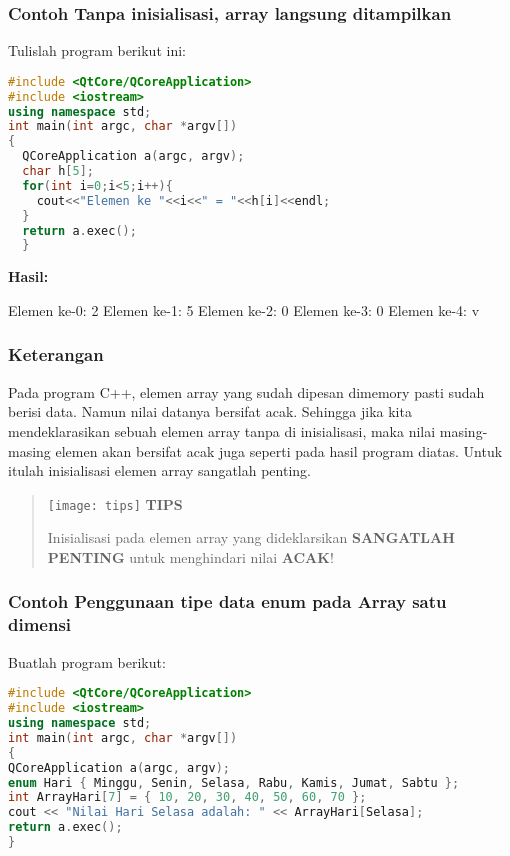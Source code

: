 \subsubsection*{Contoh  Tanpa inisialisasi, array langsung ditampilkan}

Tulislah program berikut ini:

\begin{lstlisting}[language=c++, caption=Tanpa inisialisasi array langsung ditampilkan, label=contoh3-6]
#include <QtCore/QCoreApplication>
#include <iostream>
using namespace std;
int main(int argc, char *argv[])
{
  QCoreApplication a(argc, argv);
  char h[5];
  for(int i=0;i<5;i++){
    cout<<"Elemen ke "<<i<<" = "<<h[i]<<endl;
  }
  return a.exec();
  }
\end{lstlisting}

\textbf{Hasil:}

\begin{lcverbatim}
Elemen ke-0: 2
Elemen ke-1: 5
Elemen ke-2: 0
Elemen ke-3: 0
Elemen ke-4: v
\end{lcverbatim}

\subsubsection*{Keterangan}

Pada program C++, elemen array yang sudah dipesan dimemory pasti sudah
berisi data. Namun nilai datanya bersifat acak. Sehingga jika kita
mendeklarasikan sebuah elemen array tanpa di inisialisasi, maka nilai
masing-masing elemen akan bersifat acak juga seperti pada hasil program
diatas. Untuk itulah inisialisasi elemen array sangatlah penting.

\begin{quotation}
\texttt{[image: tips]} \textbf{TIPS}
 
 Inisialisasi pada elemen array yang dideklarsikan \textbf{SANGATLAH
 PENTING} untuk menghindari nilai \textbf{ACAK}!
\end{quotation}


\subsubsection*{Contoh  Penggunaan tipe data enum pada Array satu dimensi}

Buatlah program berikut:

\begin{lstlisting}[language=c++, caption=Penggunaan tipe data enum pada Array satu dimensi, label=contoh3-7]
#include <QtCore/QCoreApplication>
#include <iostream>
using namespace std;
int main(int argc, char *argv[])
{
QCoreApplication a(argc, argv);
enum Hari { Minggu, Senin, Selasa, Rabu, Kamis, Jumat, Sabtu };
int ArrayHari[7] = { 10, 20, 30, 40, 50, 60, 70 };
cout << "Nilai Hari Selasa adalah: " << ArrayHari[Selasa];
return a.exec();
}
\end{lstlisting}

